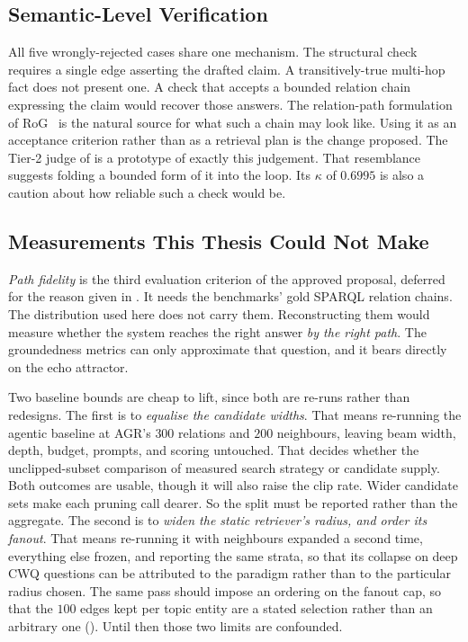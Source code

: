 \subsection{Semantic-Level Verification}

All five wrongly-rejected cases share one mechanism. The structural check
requires a single edge asserting the drafted claim. A transitively-true
multi-hop fact does not present one. A check that accepts a bounded relation
chain expressing the claim would recover those answers. The relation-path
formulation of RoG~\cite{luo2024reasoning} is the natural source for what such a
chain may look like. Using it as an acceptance criterion rather than as a
retrieval plan is the change proposed. The Tier-2 judge of
 is a prototype of exactly this judgement. That
resemblance suggests folding a bounded form of it into the loop. Its $\kappa$ of
$0.6995$ is also a caution about how reliable such a check would be.

\subsection{Measurements This Thesis Could Not Make}\label{sec:future-baselines}

\label{sec:future-path-fidelity}%
\emph{Path fidelity} is the third evaluation criterion of the approved proposal,
deferred for the reason given in . It needs the
benchmarks' gold SPARQL relation chains. The distribution used here does not
carry them. Reconstructing them would measure whether the system reaches the
right answer \emph{by the right path}. The groundedness metrics can only
approximate that question, and it bears directly on the echo attractor.

Two baseline bounds are cheap to lift, since both are re-runs rather than
redesigns. The first is to \emph{equalise the candidate widths}. That means
re-running the agentic baseline at AGR's $300$ relations and $200$ neighbours,
leaving beam width, depth, budget, prompts, and scoring untouched. That decides
whether the unclipped-subset comparison of  measured search
strategy or candidate supply. Both outcomes are usable, though it will also
raise the clip rate. Wider candidate sets make each pruning call dearer. So the
split must be reported rather than the aggregate. The second is to \emph{widen
the static retriever's radius, and order its fanout}. That means re-running it
with neighbours expanded a second time, everything else frozen, and reporting
the same strata, so that its collapse on deep CWQ questions can be attributed to
the paradigm rather than to the particular radius chosen. The same pass should
impose an ordering on the fanout cap, so that the $100$ edges kept per topic
entity are a stated selection rather than an arbitrary one
(). Until then those two limits are confounded.


